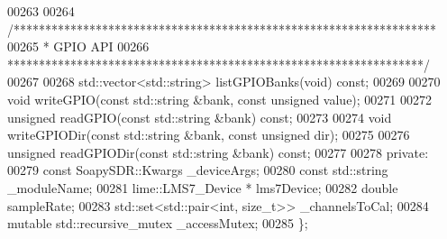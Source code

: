 \begin{DoxyCode}
00263 
00264     \textcolor{comment}{/*******************************************************************}
00265 \textcolor{comment}{     * GPIO API}
00266 \textcolor{comment}{     ******************************************************************/}
00267 
00268     std::vector<std::string> listGPIOBanks(\textcolor{keywordtype}{void}) \textcolor{keyword}{const};
00269 
00270     \textcolor{keywordtype}{void} writeGPIO(\textcolor{keyword}{const} std::string &bank, \textcolor{keyword}{const} \textcolor{keywordtype}{unsigned} value);
00271 
00272     \textcolor{keywordtype}{unsigned} readGPIO(\textcolor{keyword}{const} std::string &bank) \textcolor{keyword}{const};
00273 
00274     \textcolor{keywordtype}{void} writeGPIODir(\textcolor{keyword}{const} std::string &bank, \textcolor{keyword}{const} \textcolor{keywordtype}{unsigned} dir);
00275 
00276     \textcolor{keywordtype}{unsigned} readGPIODir(\textcolor{keyword}{const} std::string &bank) \textcolor{keyword}{const};
00277 
00278 \textcolor{keyword}{private}:
00279     \textcolor{keyword}{const} SoapySDR::Kwargs _deviceArgs; 
00280     \textcolor{keyword}{const} std::string _moduleName;
00281     lime::LMS7_Device * lms7Device;
00282     \textcolor{keywordtype}{double} sampleRate;
00283     std::set<std::pair<int, size\_t>> _channelsToCal;
00284     \textcolor{keyword}{mutable} std::recursive\_mutex _accessMutex;
00285 \};
\end{DoxyCode}
